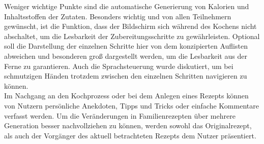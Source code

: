 Weniger wichtige Punkte sind die automatische Generierung von Kalorien und Inhaltsstoffen der Zutaten. Besonders wichtig und von allen Teilnehmern gewünscht, ist die Funktion, dass der Bildschirm sich während des Kochens nicht abschaltet, um die Lesbarkeit der Zubereitungsschritte zu gewährleisten. Optional soll die Darstellung der einzelnen Schritte hier von dem konzipierten Auflisten abweichen und besonderen groß dargestellt werden, um die Lesbarkeit aus der Ferne zu garantieren. Auch die Sprachsteuerung wurde diskutiert, um bei schmutzigen Händen trotzdem zwischen den einzelnen Schritten navigieren zu können.\\ 

Im Nachgang an den Kochprozess oder bei dem Anlegen eines Rezepts können von Nutzern persönliche Anekdoten, Tipps und Tricks oder einfache Kommentare verfasst werden. Um die Veränderungen in Familienrezepten über mehrere Generation besser nachvollziehen zu können, werden sowohl das Originalrezept, als auch der Vorgänger des aktuell betrachteten Rezepts dem Nutzer präsentiert.


